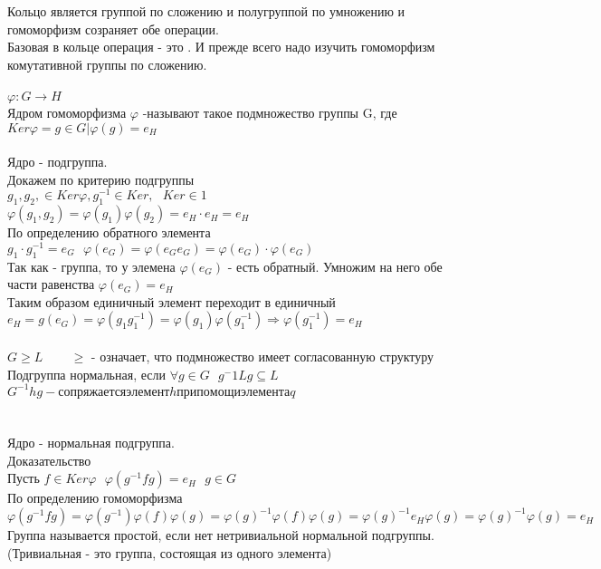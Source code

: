 \begin{center}
\end{center}

Кольцо является группой по сложению и полугруппой по умножению и гомоморфизм 
созраняет обе операции. \\
Базовая в кольце операция - это . И прежде всего надо изучить
гомоморфизм комутативной группы по сложению.\\

\\
$\varphi:G \to H$\\
Ядром гомоморфизма $\varphi$ -называют такое подмножество группы G, где 
$Ker \varphi = {g \in G|\varphi (g) = e_H}$ \\

\\
Ядро - подгруппа.\\
Докажем по критерию подгруппы\\
$g_1, g_2, \in Ker\varphi, g^{-1}_1 \in Ker, ~~~ Ker \in 1$\\
$\varphi(g_1, g_2) = \varphi(g_1) \varphi(g_2) = e_H \cdot e_H = e_H$\\
По определению обратного элемента $g_1 \cdot g^{-1}_1 = e_G ~~~ 
\varphi(e_G) = \varphi(e_G e_G) = \varphi(e_G) \cdot \varphi(e_G)$\\

Так как  - группа, то у элемена $\varphi(e_G)$ - есть обратный. Умножим 
на него обе части равенства $\varphi(e_G) = e_H$\\
Таким образом единичный элемент переходит в единичный\\
$e_H = g(e_G) = \varphi(g_1 g^{-1}_1) = \varphi(g_1)\varphi(g^{-1}_1) 
\Rightarrow \varphi(g^{-1}_1) = e_H$\\

\\
$G \ge L$ ~~~ $\ge$ - означает, что подмножество имеет согласованную структуру\\
Подгруппа нормальная, если $\forall g \in G ~~~ g^-1 Lg \subseteq L$\\
$G^{-1}hg - сопряжается элемент h при помощи элемента q$\\
\\

\\
Ядро - нормальная подгруппа.\\
Доказательство\\
Пусть $f \in Ker\varphi ~~~ \varphi(g^{-1} fg) = e_H ~~~ g\in G$\\
По определению гомоморфизма 
$\varphi(g^{-1} fg) = \varphi(g^{-1}) \varphi(f) \varphi(g) = \varphi(g)^{-1}
\varphi(f) \varphi(g) = \varphi(g)^{-1} e_H \varphi(g) = \varphi(g)^{-1} 
\varphi(g) = e_H$\\
Группа называется простой, если нет нетривиальной нормальной подгруппы. 
(Тривиальная - это группа, состоящая из одного элемента)\\

